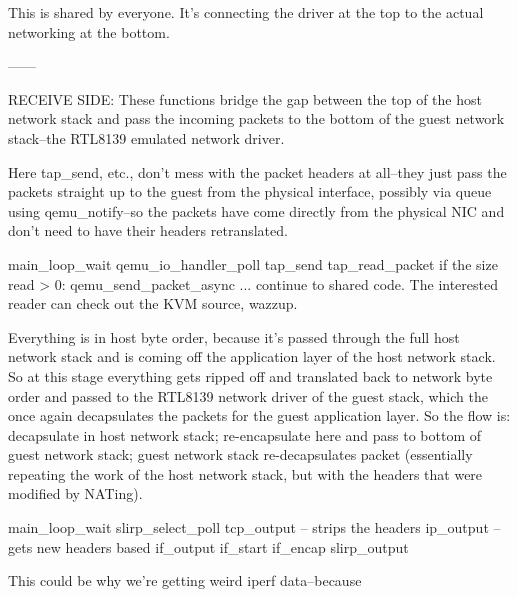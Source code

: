 \documentclass[11pt,pdftex,twocolumn]{article}
\begin{document}
This is shared by everyone. It's connecting the driver at the top to the actual networking at the bottom. 

------

RECEIVE SIDE:
These functions bridge the gap between the top of the host network stack and pass the incoming packets to the bottom of the guest network stack--the RTL8139 emulated network driver. 

Here tap_send, etc., don't mess with the packet headers at all--they just pass the packets straight up to the guest from the physical interface, possibly via queue using qemu_notify--so the packets have come directly from the physical NIC and don't need to have their headers retranslated.

main_loop_wait
qemu_io_handler_poll
tap_send
tap_read_packet
if the size read > 0:
	qemu_send_packet_async
... continue to shared code. The interested reader can check out the KVM source, wazzup.

Everything is in host byte order, because it's passed through the full host network stack and is coming off the application layer of the host network stack. So at this stage everything gets ripped off and translated back to network byte order and passed to the RTL8139 network driver of the guest stack, which the once again decapsulates the packets for the guest application layer. So the flow is: decapsulate in host network stack; re-encapsulate here and pass to bottom of guest network stack; guest network stack re-decapsulates packet (essentially repeating the work of the host network stack, but with the headers that were modified by NATing). 

main_loop_wait
slirp_select_poll
tcp_output -- strips the headers
ip_output -- gets new headers based 
if_output
if_start
if_encap
slirp_output

This could be why we're getting weird iperf data--because 








{\footnotesize 
}
\end{document}
